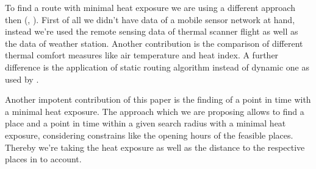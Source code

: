 To find a route with minimal heat exposure we are using a different approach then \citeauthor{Dang2012} (\citeyear{Dang2012}, \citeyear{Dang2013}). First of all we didn't have data of a mobile sensor network at hand, instead we're used the remote sensing data of thermal scanner flight as well as the data of weather station. Another contribution is the comparison of different thermal comfort measures like air temperature and heat index. A further difference is the application of static routing algorithm instead of dynamic one as used by \citeauthor{Dang2012}.

Another impotent contribution of this paper is the finding of a point in time with a minimal heat exposure. The approach which we are proposing allows to find a place and a point in time within a given search radius with a minimal heat exposure, considering constrains like the opening hours of the feasible places. Thereby we're taking the heat exposure as well as the distance to the respective places in to account.   



